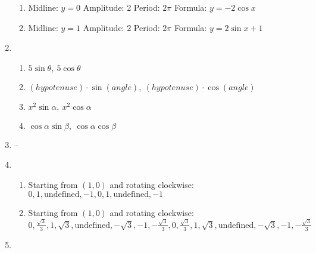 \documentclass{article}
\begin{document}
\begin{enumerate}
\begin{enumerate}
	\item Midline: $y = 0$ \newline
		Amplitude: 2 \newline
		Period: $2\pi$ \newline
		Formula: $y = -2\cos{x}$
		
	\item Midline: $y = 1$ \newline
		Amplitude: 2 \newline
		Period: $2\pi$ \newline
		Formula: $y = 2\sin{x} + 1$
	
	\end{enumerate}
	
\item

	\begin{enumerate}
	
	\item $5\sin{\theta}, \ 5\cos{\theta}$
	
	\item $(hypotenuse)\cdot \sin{(angle)}, \ (hypotenuse) \cdot \cos{(angle)}$
	
	\item $x^2\sin{\alpha}, \ x^2\cos{\alpha}$
	
	\item $\cos{\alpha}\sin{\beta}, \ \cos{\alpha}\cos{\beta}$
	
	\end{enumerate}
	
\item --

\item 

	\begin{enumerate}
	
	\item Starting from $(1,0)$ and rotating clockwise: \newline
		$0, 1, \text{undefined}, -1, 0, 1, \text{undefined}, -1$
		
	\item Starting from $(1,0)$ and rotating clockwise: \newline
		$0, \frac{\sqrt{3}}{3}, 1, \sqrt{3}, \text{undefined}, -\sqrt{3}, -1, -\frac{\sqrt{3}}{3}, 0, \frac{\sqrt{3}}{3}, 1, \sqrt{3},
		\text{undefined}, -\sqrt{3}, -1, -\frac{\sqrt{3}}{3}$
	
	\end{enumerate}
	
\item


\end{enumerate}
\end{document}
